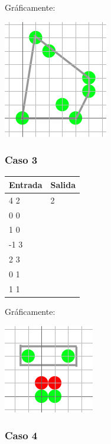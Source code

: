 Gráficamente:

\includegraphics[scale=0.5]{img/ej3c2.png}

\subsubsection*{Caso 3}

\begin{center}
    \begin{tabular}{| l | l |}
    \hline
    Entrada & Salida \\ \hline
	4 2 & 2 \\
	0 0 & \\
	1 0 & \\
	-1 3 & \\
	2 3 & \\
	0 1 & \\
	1 1 & \\
	\hline
    \end{tabular}
\end{center}

Gráficamente:

\includegraphics[scale=0.5]{img/ej3c3.png}

\subsubsection*{Caso 4}


